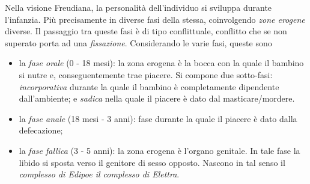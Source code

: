 \documentclass{subfiles}
\begin{document}
Nella visione Freudiana, la personalità dell'individuo si sviluppa durante l'infanzia.
Più precisamente in diverse fasi della stessa, coinvolgendo \emph{zone erogene} diverse.
Il passaggio tra queste fasi è di tipo conflittuale, conflitto che se non superato porta ad una \emph{fissazione}.
Considerando le varie fasi, queste sono
\begin{itemize}
    \item la \emph{fase orale} (0 - 18 mesi): la zona erogena è la bocca con la quale il bambino si nutre e,
          conseguentemente trae piacere.
          Si compone due sotto-fasi: \emph{incorporativa} durante la quale il bambino è completamente dipendente dall'ambiente;
          e \emph{sadica} nella quale il piacere è dato dal masticare/mordere.

    \item la \emph{fase anale} (18 mesi - 3 anni): fase durante la quale il piacere è dato dalla defecazione;
    \item la \emph{fase fallica} (3 - 5 anni): la zona erogena è l'organo genitale.
          In tale fase la libido si sposta verso il genitore di sesso opposto.
          Nascono in tal senso il \emph{complesso di Edipo\emph{e il} complesso di Elettra}.
\end{itemize}
\end{document}
